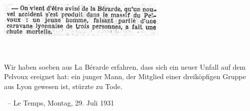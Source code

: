 \documentclass[aspectratio=1610,onlymath]{beamer}
\begin{document}
\maketitle

\begin{frame}

\begin{center}
\scalebox{14}{$\theta\quad\tau$}
\end{center}

\end{frame}

\bgroup
{}
\begin{frame}[plain]\label{frame_temps_a}
\color{white}
\begin{center}
\includegraphics[height=1.7cm]{images/Le_Temps_1931-07-29_Herbrand-BnF.jpg}\vspace{1cm}

\tt
\begin{minipage}{13.5cm}\normalsize
Wir haben soeben aus La Bérarde erfahren, dass sich ein neuer Unfall auf dem Pelvoux ereignet hat:
ein junger Mann, der Mitglied einer dreiköpfigen Gruppe aus Lyon gewesen ist, stürzte zu Tode.
\end{minipage}

% 
\bigskip\normalsize

~-- Le Temps, Montag, 29. Juli 1931
\end{center}

\end{frame}
\egroup
\end{document}
